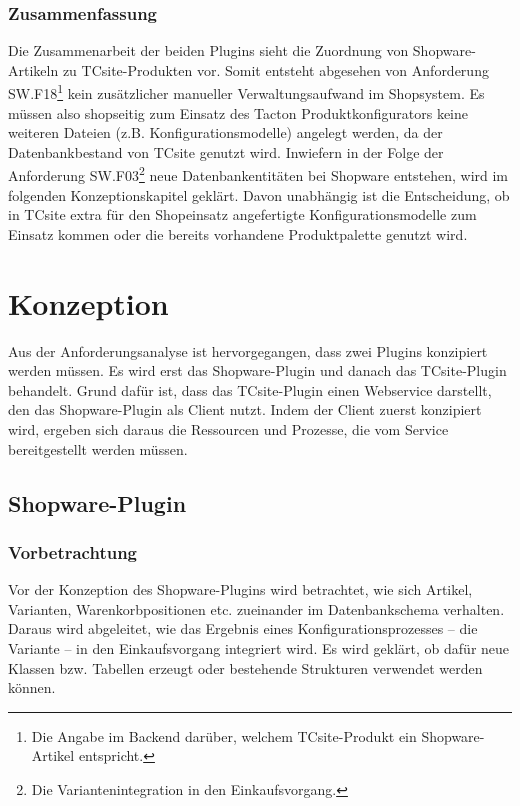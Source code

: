 \documentclass[11pt, a4paper, titlepage, listof=totoc, bibliography=totoc, index=totoc, twoside, openright, headings=normal]{scrreprt}
\begin{document}
\subsection*{Zusammenfassung}
Die Zusammenarbeit der beiden Plugins sieht die Zuordnung von Shopware-Artikeln zu TCsite-Produkten vor. Somit entsteht abgesehen von Anforderung SW.F18\footnote{Die Angabe im Backend darüber, welchem TCsite-Produkt ein Shopware-Artikel entspricht.} kein zusätzlicher manueller Verwaltungsaufwand im Shopsystem. Es müssen also shopseitig zum Einsatz des Tacton Produktkonfigurators keine weiteren Dateien (z.B. Konfigurationsmodelle) angelegt werden, da der Datenbankbestand von TCsite genutzt wird. Inwiefern in der Folge der Anforderung SW.F03\footnote{Die Variantenintegration in den Einkaufsvorgang.} neue Datenbankentitäten bei Shopware entstehen, wird im folgenden Konzeptionskapitel geklärt. Davon unabhängig ist die Entscheidung, ob in TCsite extra für den Shopeinsatz angefertigte Konfigurationsmodelle zum Einsatz kommen oder die bereits vorhandene Produktpalette genutzt wird.

\chapter{Konzeption}
\label{Konzeption}
Aus der Anforderungsanalyse ist hervorgegangen, dass zwei Plugins konzipiert werden müssen. Es wird erst das Shopware-Plugin und danach das TCsite-Plugin behandelt. Grund dafür ist, dass das TCsite-Plugin einen Webservice darstellt, den das Shopware-Plugin als Client nutzt. Indem der Client zuerst konzipiert wird, ergeben sich daraus die Ressourcen und Prozesse, die vom Service bereitgestellt werden müssen.

\section{Shopware-Plugin}
\label{Shopware-Plugin}
\subsection{Vorbetrachtung}
Vor der Konzeption des Shopware-Plugins wird betrachtet, wie sich Artikel, Varianten, Warenkorbpositionen etc. zueinander im Datenbankschema verhalten. Daraus wird abgeleitet, wie das Ergebnis eines Konfigurationsprozesses -- die Variante -- in den Einkaufsvorgang integriert wird. Es wird geklärt, ob dafür neue Klassen bzw. Tabellen erzeugt oder bestehende Strukturen verwendet werden können.
\end{document}
